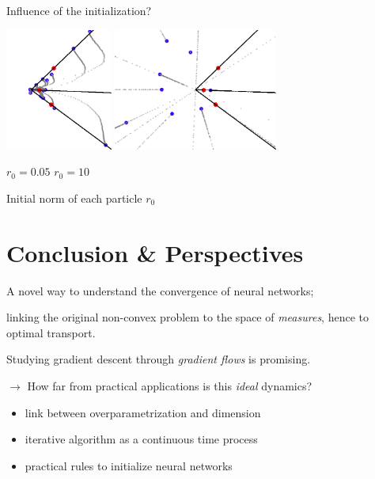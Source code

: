 \documentclass{beamer}
\begin{document}
\begin{frame}{\secname}

Influence of the initialization?

\vspace{1em}


\hspace{1em} \includegraphics[height=4cm]{images/005.png} \hspace{2em}
\includegraphics[height=4cm]{images/10.png}
\begin{center}

 \hspace{4em} $r_0 = 0.05$  \hspace{9em} $r_0=10$ \hspace{5em} 

Initial norm of each particle $r_0$
\end{center}

\end{frame}

\section{Conclusion \& Perspectives}

\begin{frame}{\secname}

A novel way to understand the convergence of neural networks;

linking the original non-convex problem to the space of \textit{measures}, hence to optimal transport.

\vspace{1em}

Studying gradient descent through \textit{gradient flows} is promising.

\vspace{1em}

$\rightarrow$ How far from practical applications is this \textit{ideal} dynamics?
\begin{itemize}
\item link between overparametrization and dimension
\item iterative algorithm as a continuous time process
\item practical rules to initialize neural networks
\end{itemize}

\end{frame}
\end{document}
